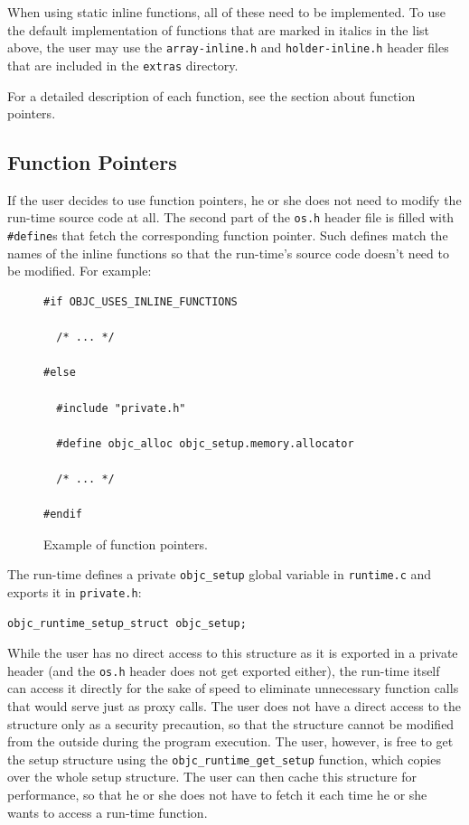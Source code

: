 When using static inline functions, all of these need to be implemented. To use the default implementation of functions that are marked in italics in the list above, the user may use the \verb=array-inline.h= and \verb=holder-inline.h= header files that are included in the \verb=extras= directory.

For a detailed description of each function, see the section about function pointers.

\subsection{Function Pointers}

If the user decides to use function pointers, he or she does not need to modify the run-time source code at all. The second part of the \verb=os.h= header file is filled with \verb=#define=s that fetch the corresponding function pointer. Such defines match the names of the inline functions so that the run-time's source code doesn't need to be modified. For example:

\begin{figure}[H]
\begin{verbatim}
#if OBJC_USES_INLINE_FUNCTIONS

  /* ... */

#else

  #include "private.h"

  #define objc_alloc objc_setup.memory.allocator

  /* ... */

#endif

\end{verbatim}
\centering{}
\caption{Example of function pointers.}
\label{ref:function_ptrs_defs}
\end{figure}

The run-time defines a private \verb=objc_setup= global variable in \verb=runtime.c= and exports it in \verb=private.h=:
 
\begin{verbatim}
objc_runtime_setup_struct objc_setup;
\end{verbatim}

While the user has no direct access to this structure as it is exported in a private header (and the \verb=os.h= header does not get exported either), the run-time itself can access it directly for the sake of speed to eliminate unnecessary function calls that would serve just as proxy calls. The user does not have a direct access to the structure only as a security precaution, so that the structure cannot be modified from the outside during the program execution. The user, however, is free to get the setup structure using the \verb=objc_runtime_get_setup= function, which copies over the whole setup structure. The user can then cache this structure for performance, so that he or she does not have to fetch it each time he or she wants to access a run-time function.

